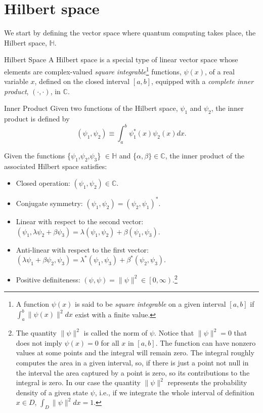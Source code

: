 \section{Hilbert space}
We start by defining the vector space where quantum computing takes place, the Hilbert space, $\mathbb{H}$.
\begin{definition}{Hilbert Space}{}
A Hilbert space is a special type of linear vector space whose elements are complex-valued \textit{square integrable}\footnote{A function $\psi(x)$ is said to be \textit{square integrable} on a given interval $\left[a, b\right]$ if $\int_{a}^{b}\|\psi(x)\|^{2}dx$ exist with a finite value.} functions, $\psi(x)$, of a real variable $x$, defined on the closed interval $\left[a, b\right]$, equipped with a \textit{complete inner product}, $(\cdot,\cdot)$, in $\mathbb{C}$.
\end{definition}
\begin{definition}{Inner Product}{}
Given two functions of the Hilbert space, $\psi_{1}$ and $\psi_{2}$, the inner product is defined by
\begin{equation}
    \left(\psi_{1}, \psi_{2}\right) \equiv \int^{b}_{a} \psi_{1}^{*}(x)\psi_{2}(x)dx.
\end{equation}
\end{definition}
\begin{corollary}{}{}
 Given the functions \{$\psi_{1}$,$\psi_{2}$,$\psi_{3}$\} $\in \mathbb{H}$ and \{$\alpha, \beta\} \in \mathbb{C}$, the inner product of the associated Hilbert space satisfies:
\begin{itemize}
    \item Closed operation: $(\psi_{1},\psi_{2})\in \mathbb{C}$.
    \item Conjugate symmetry: $(\psi_{1},\psi_{2}) = (\psi_{2},\psi_{1})^{*}$.
    \item Linear with respect to the second vector: $(\psi_{1},\lambda  \psi_{2} + \beta\psi_{3}) = \lambda(\psi_{1},\psi_{2}) + \beta(\psi_{1},\psi_{3})$.
    \item Anti-linear with respect to the first vector: $(\lambda  \psi_{1} + \beta \psi_{2}, \psi_{3}) = \lambda^{*}(\psi_{1},\psi_{3}) + \beta^{*} (\psi_{2},\psi_{3})$.
    \item Positive definiteness: $(\psi, \psi) = \lVert \psi \rVert^{2} \in \left[0,\infty\right)$.\footnote{The quantity $\lVert \psi \rVert^{2}$ is called the norm of $\psi$. Notice that $\lVert \psi \rVert^{2} = 0$ that does not imply $\psi(x) = 0$ for all $x$ in $\left[a,b\right]$. The function can have nonzero values at some points and the integral will remain zero. The integral roughly computes the area in a given interval, so, if there is just a point not null in the interval the area captured by a point is zero, so its contributions to the integral is zero. In our case the quantity $\lVert \psi \rVert^{2}$ represents the probability density of a given state $\psi$, i.e., if we integrate the whole interval of definition $x \in D$, $\int_{D}\lVert \psi \rVert^{2}dx = 1$.}
\end{itemize}    
\end{corollary}
